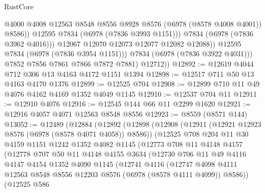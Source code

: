 \begin{lexlean}{RustCore}
\begin{coremodule}
                          @4000
                          @4008
                          @12563
                          @8548
                          @8556
                          @8928
                          @8576
                          (@6978 (@8578 @4008 @4001))
                          @8586))
                      @12595
                      @7834
                      (@6978 (@7836 @3993 @1151)))
                    @7834
                    (@6978 (@7836 @3962 @4016)))
                  @12067
                  @12070
                  @12073
                  @12077
                  @12082
                  @12088))
              @12595
              @7834
              (@6978 (@7836 @3954 @1151)))
            @7834
            (@6978 (@7836 @3922 @4031)))
          @7852
          @7856
          @7861
          @7866
          @7872
          @7881)
        @12712))
@12892 := @12619 @4044 @712 @306 @13 @4163 @4172 @1151 @1394
@12898 := @12517 @711 @50 @13 @4163 @4170 @1376
@12899 := @12525 @704
@12908 := @12899 @710 @11 @49 @4076 @4162 @4169 @1352 @4049 @1145
@12910 := @12537 @704 @11
@12911 := @12910 @4076
@12916 := @12545 @144 @66 @11 @2299 @1620
@12921 := @12916 @4057 @4071 @12563 @8548 @8556
@12923 := @8559 (@8571 @144)
@13052 := @12489
    (@12884
      (@12892
        (@12898
          (@12908
            (@12911 (@12921 @12923 @8576 (@6978 (@8578 @4071 @4058)) @8586))
            (@12525
              @708
              @204
              @11
              @30
              @4159
              @1151
              @1242
              @1352
              @4082
              @1145
              (@12773
                @708
                @11
                @4148
                @4157
                (@12778
                  @707
                  @50
                  @11
                  @4148
                  @4155
                  @3634
                  (@12730
                    @706
                    @11
                    @49
                    @4116
                    @4147
                    @4154
                    @1352
                    @4090
                    @1145
                    (@12741
                      @4116
                      (@12747
                        @4098
                        @4111
                        @12563
                        @8548
                        @8556
                        @12203
                        @8576
                        (@6978 (@8578 @4111 @4099))
                        @8586))
                    (@12525
                      @586

\end{coremodule}
\end{lexlean}
